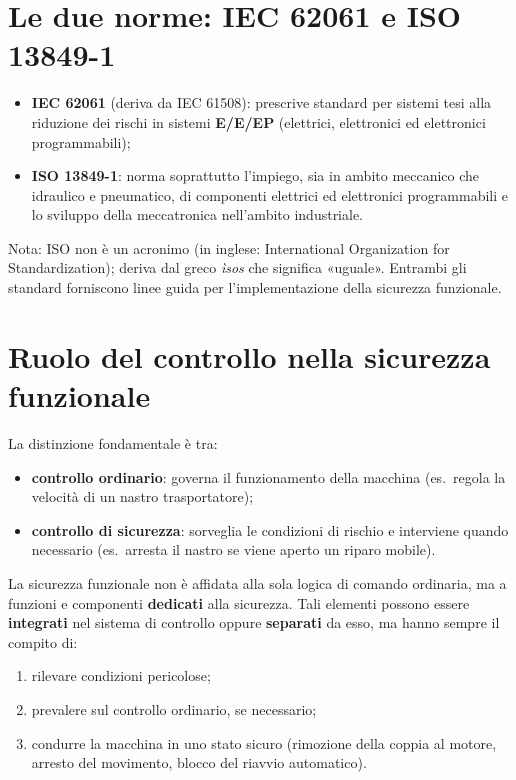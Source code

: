 \section{Le due norme: IEC 62061 e ISO 13849-1}
\begin{itemize}
    \item \textbf{IEC 62061} (deriva da IEC 61508): prescrive standard per sistemi tesi alla riduzione dei rischi in sistemi \textbf{E/E/EP} (elettrici, elettronici ed elettronici programmabili);
    \item \textbf{ISO 13849-1}: norma soprattutto l'impiego, sia in ambito meccanico che idraulico e pneumatico, di componenti elettrici ed elettronici programmabili e lo sviluppo della meccatronica nell'ambito industriale.
\end{itemize}
Nota: ISO non è un acronimo (in inglese: International Organization for Standardization); deriva dal greco \emph{ìsos} che significa «uguale». Entrambi gli standard forniscono linee guida per l'implementazione della sicurezza funzionale.

\section{Ruolo del controllo nella sicurezza funzionale}
La distinzione fondamentale è tra:
\begin{itemize}
    \item \textbf{controllo ordinario}: governa il funzionamento della macchina (es.\ regola la velocità di un nastro trasportatore);
    \item \textbf{controllo di sicurezza}: sorveglia le condizioni di rischio e interviene quando necessario (es.\ arresta il nastro se viene aperto un riparo mobile).
\end{itemize}
La sicurezza funzionale non è affidata alla sola logica di comando ordinaria, ma a funzioni e componenti \textbf{dedicati} alla sicurezza. Tali elementi possono essere \textbf{integrati} nel sistema di controllo oppure \textbf{separati} da esso, ma hanno sempre il compito di:
\begin{enumerate}
    \item rilevare condizioni pericolose;
    \item prevalere sul controllo ordinario, se necessario;
    \item condurre la macchina in uno stato sicuro (rimozione della coppia al motore, arresto del movimento, blocco del riavvio automatico).
\end{enumerate}

